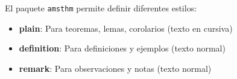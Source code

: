 \begin{note}
El paquete \texttt{amsthm} permite definir diferentes estilos:
\begin{itemize}
\item \textbf{plain}: Para teoremas, lemas, corolarios (texto en cursiva)
\item \textbf{definition}: Para definiciones y ejemplos (texto normal)
\item \textbf{remark}: Para observaciones y notas (texto normal)
\end{itemize}
\end{note}
